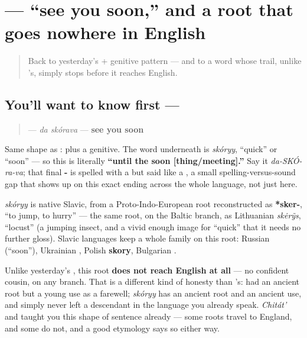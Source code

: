 \section[\texorpdfstring{\ru{до} \ru{скорого} (da skórava)}{до скорого (da skórava)}]{  — \textquotedblleft{}see you soon,\textquotedblright{} and a root that goes nowhere in English}

\label{lesson:RU-C11-do-skorogo}



\begin{quote}
Back to yesterday's \emph{} + genitive pattern — and to a word whose trail, unlike \emph{}'s, simply stops before it reaches English.
\end{quote}

\subsection*{You'll want to know first —  }
\begin{quote}
\textbf{ } — \emph{da skórava} — \textbf{see you soon}
\end{quote}

Same shape as \emph{ }: \textbf{} plus a genitive. The word underneath is \emph{skóryy}, \textquotedblleft{}quick\textquotedblright{} or \textquotedblleft{}soon\textquotedblright{} — so this is literally \textbf{\textquotedblleft{}until the soon {[}thing/meeting{]}.\textquotedblright{}} Say it \emph{da-SKÓ-ra-va}; that final \textbf{-} is spelled with a \textbf{} but said like a \textbf{}, a small spelling-versus-sound gap that shows up on this exact ending across the whole language, not just here.

\begin{cousinweb}
\emph{skóryy} is native Slavic, from a Proto-Indo-European root reconstructed as \textbf{*sker-}, \textquotedblleft{}to jump, to hurry\textquotedblright{} — the same root, on the Baltic branch, as Lithuanian \emph{skėrỹs}, \textquotedblleft{}locust\textquotedblright{} (a jumping insect, and a vivid enough image for \textquotedblleft{}quick\textquotedblright{} that it needs no further gloss). Slavic languages keep a whole family on this root: Russian \textbf{} (\textquotedblleft{}soon\textquotedblright{}), Ukrainian \textbf{}, Polish \textbf{skory}, Bulgarian \textbf{}.

Unlike yesterday's \emph{ }, this root \textbf{does not reach English at all} — no confident cousin, on any branch. That is a different kind of honesty than \emph{}'s: \emph{} had an ancient root but a young use as a farewell; \emph{skóryy} has an ancient root and an ancient use, and simply never left a descendant in the language you already speak. \emph{Chitát'} and \emph{} taught you this shape of sentence already — some roots travel to England, and some do not, and a good etymology says so either way.
\end{cousinweb}

